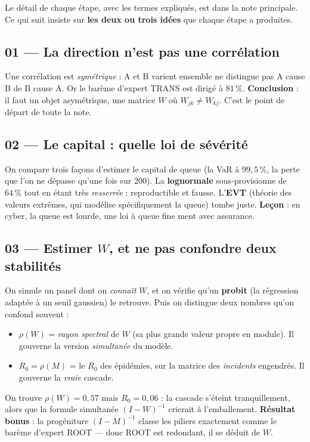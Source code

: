 \documentclass[11pt,a4paper]{article}
\begin{document}
\noindent Le détail de chaque étape, avec les termes expliqués, est dans la note principale.
Ce qui suit insiste sur \textbf{les deux ou trois idées} que chaque étape a produites.

\subsection{01 --- La direction n'est pas une corrélation}
Une corrélation est \emph{symétrique} : \og{}A et B varient ensemble\fg{} ne distingue pas
\og{}A cause B\fg{} de \og{}B cause A\fg{}. Or le barème d'expert TRANS est dirigé à $81\,\%$.
\textbf{Conclusion} : il faut un objet asymétrique, une matrice $W$ où $W_{jk}\neq W_{kj}$.
C'est le point de départ de toute la note.

\subsection{02 --- Le capital : quelle loi de sévérité}
On compare trois façons d'estimer le capital de queue (la VaR à $99{,}5\,\%$, la perte que l'on
ne dépasse qu'une fois sur 200). La \textbf{lognormale} sous-provisionne de $64\,\%$ tout en
étant très \emph{resserrée} : reproductible et fausse. L'\textbf{EVT} (théorie des valeurs
extrêmes, qui modélise spécifiquement la queue) tombe juste. \textbf{Leçon} : en cyber, la
queue est lourde, une loi à queue fine ment avec assurance.

\subsection{03 --- Estimer $W$, et ne pas confondre deux stabilités}
On simule un panel dont on \emph{connaît} $W$, et on vérifie qu'un \textbf{probit} (la
régression adaptée à un seuil gaussien) le retrouve. Puis on distingue deux nombres qu'on
confond souvent :
\begin{itemize}[leftmargin=1.4em,itemsep=1pt]
\item $\rho(W)$ = \emph{rayon spectral} de $W$ (sa plus grande valeur propre en module). Il
  gouverne la version \emph{simultanée} du modèle.
\item $R_0=\rho(M)$ = le \og{}$R_0$\fg{} des épidémies, sur la matrice des \emph{incidents}
  engendrés. Il gouverne la \emph{vraie} cascade.
\end{itemize}
On trouve $\rho(W)=0{,}57$ mais $R_0=0{,}06$ : la cascade s'éteint tranquillement, alors que la
formule simultanée $(I-W)^{-1}$ crierait à l'emballement. \textbf{Résultat bonus} : la
\og{}progéniture\fg{} $(I-M)^{-1}$ classe les piliers exactement comme le barème d'expert ROOT
--- donc ROOT est redondant, il se déduit de $W$.
\end{document}
